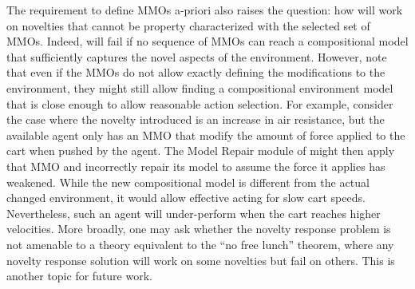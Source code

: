 \documentclass{article}
\begin{document}
The requirement to define MMOs a-priori also raises the question: how will \hydra work on novelties that cannot be property characterized with the selected set of MMOs. Indeed, \hydra will fail if no sequence of MMOs can reach a compositional model that sufficiently captures the novel aspects of the environment. However, note that even if the MMOs do not allow exactly defining the modifications to the environment, they might still allow finding a compositional environment model that is close enough to allow reasonable action selection. 
For example, consider the case where the novelty introduced is an increase in air resistance, but the available \hydra agent only has an MMO that modify the amount of force applied to the cart when pushed by the agent. The Model Repair module of \hydra might then apply that MMO and incorrectly repair its model to assume the force it applies has weakened. While the new compositional model is different from the actual changed environment, it would allow effective acting for slow cart speeds. Nevertheless, such an agent will under-perform when the cart reaches higher velocities. 
More broadly, one may ask whether the novelty response problem is not amenable to a theory equivalent to the ``no free lunch'' theorem, where any novelty response solution will work on some novelties but fail on others. This is another topic for future work. 
\end{document}
